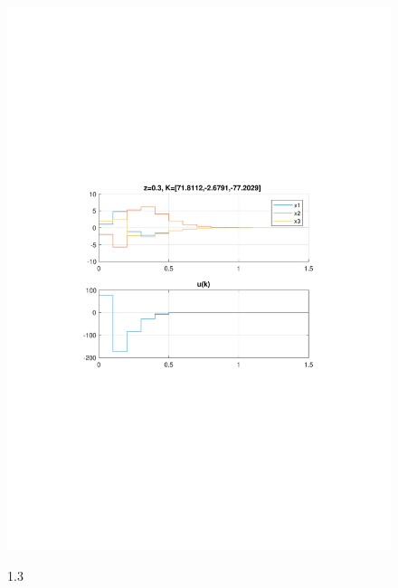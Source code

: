 \documentclass{article}
\begin{document}
{\begin{figure}[H]
\includegraphics[clip, trim=0.5cm 9.5cm 0.5cm 9.5cm, width=1.00\textwidth]{../rys/zad3_rys3.pdf}
\label{fig:rys3.1.3}
\caption{1.3}
\end{figure}
}
\end{document}
